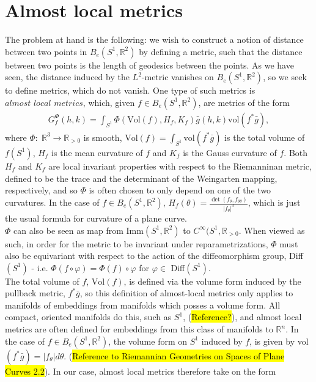 \documentclass[a4,danish]{article}
\theoremstyle{break}
\theoremstyle{definition}
\theoremstyle{Break}
\newcommand{\R}{\mathbb{R}}
\renewcommand{\phi}{\varphi}
\begin{document}

\section*{Almost local metrics}
\label{sec:al-metrics}

The problem at hand is the following: we wish to construct a notion of distance between two points in $B_e(S^1,\R^2)$ by defining a metric, such that the distance between two points is the length of geodesics between the points. As we have seen, the distance induced by the $L^2$-metric vanishes on $B_e(S^1, \R^2)$, so we seek to define metrics, which do not vanish. One type of such metrics is $\textit{almost local metrics}$, which, given $f \in B_e(S^1, \R^2)$, are metrics of the form
\begin{align*}
G_f^\Phi (h,k) = \int_{S^1} \Phi(\text{Vol}(f), H_f, K_f) \bar{g}(h,k) \text{vol}(f^* \bar{g}),
\end{align*}
where $\Phi: \; \R^3 \rightarrow \R_{> 0}$ is smooth, $\text{Vol}(f) = \int_{S^1} \text{vol}(f^* \bar{g})$ is the total volume of $f(S^1)$, $H_f$ is the mean curvature of $f$ and $K_f$ is the Gauss curvature of $f$. Both $H_f$ and $K_f$ are local invariant properties with respect to the Riemanninan metric, defined to be the trace and the determinant of the Weingarten mapping, respectively, and so $\Phi$ is often chosen to only depend on one of the two curvatures. In the case of $f \in B_e(S^1, \R^2)$, $H_f(\theta) = \frac{\det(f_\theta, f_{\theta \theta})}{\left| f_\theta \right| ^3}$, which is just the usual formula for curvature of a plane curve.\\[0.2 cm]
$\Phi$ can also be seen as map from Imm$(S^1, \R^2)$ to $C^\infty (S^1, \R_{> 0}$. When viewed as such, in order for the metric to be invariant under reparametrizations, $\Phi$ must also be equivariant with respect to the action of the diffeomorphism group, Diff$(S^1)$ - i.e. $\Phi(f \circ \phi) = \Phi(f) \circ \phi$ for $\phi \in$ Diff$(S^1)$. \\[0.2 cm]
The total volume of $f$, $\text{Vol}(f)$, is defined via the volume form induced by the pullback metric, $f^*\bar{g}$, so this definition of almost-local metrics only applies to manifolds of embeddings from manifolds which posses a volume form. All compact, oriented manifolds do this, such as $S^1$, (\hl{Reference?}), and almost local metrics are often defined for embeddings from this class of manifolds to $\R^n$. In the case of $f \in B_e(S^1, \R^2)$, the volume form on $S^1$ induced by $f$, is given by vol$(f^*\bar{g}) = \left| f_\theta \right| d \theta$. (\hl{Reference to Riemannian Geometries on Spaces of Plane Curves 2.2}). In our case, almost local metrics therefore take on the form
\end{document}
